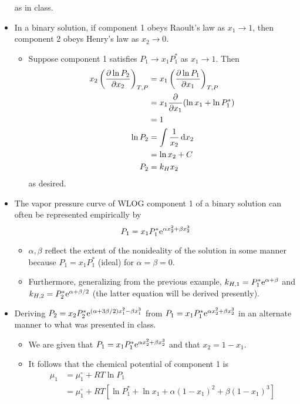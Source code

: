 \documentclass[../notes.tex]{subfiles}
\begin{document}
\begin{itemize}
    as in class.
    \item In a binary solution, if component 1 obeys Raoult's law as $x_1\to 1$, then component 2 obeys Henry's law as $x_2\to 0$.
    \begin{itemize}
        \item Suppose component 1 satisfies $P_1\to x_1P_1^*$ as $x_1\to 1$. Then
        \begin{align*}
            x_2\left( \pdv{\ln P_2}{x_2} \right)_{T,P} &= x_1\left( \pdv{\ln P_1}{x_1} \right)_{T,P}\\
            &= x_1\pdv{x_1}(\ln x_1+\ln P_1^*)\\
            &= 1\\
            \ln P_2 &= \int\frac{1}{x_2}\dd{x_2}\\
            &= \ln x_2+C\\
            P_2 &= k_Hx_2
        \end{align*}
        as desired.
    \end{itemize}
    \item The vapor pressure curve of WLOG component 1 of a binary solution can often be represented empirically by
    \begin{equation*}
        P_1 = x_1P_1^*\e[\alpha x_2^2+\beta x_2^3]
    \end{equation*}
    \begin{itemize}
        \item $\alpha,\beta$ reflect the extent of the nonideality of the solution in some manner because $P_1=x_1P_1^*$ (ideal) for $\alpha=\beta=0$.
        \item Furthermore, generalizing from the previous example, $k_{H,1}=P_1^*\e[\alpha+\beta]$ and $k_{H,2}=P_2^*\e[\alpha+\beta/2]$ (the latter equation will be derived presently).
    \end{itemize}
    \item Deriving $P_2=x_2P_2^*\e[(\alpha+3\beta/2)x_1^2-\beta x_1^3]$ from $P_1=x_1P_1^*\e[\alpha x_2^2+\beta x_2^3]$ in an alternate manner to what was presented in class.
    \begin{itemize}
        \item We are given that $P_1=x_1P_1^*\e[\alpha x_2^2+\beta x_2^3]$ and that $x_2=1-x_1$.
        \item It follows that the chemical potential of component 1 is
        \begin{align*}
            \mu_1 &= \mu_1^\circ+RT\ln P_1\\
            &= \mu_1^\circ+RT\left[ \ln P_1^*+\ln x_1+\alpha(1-x_1)^2+\beta(1-x_1)^3 \right]

\end{align*}
\end{itemize}
\end{itemize}
\end{document}
